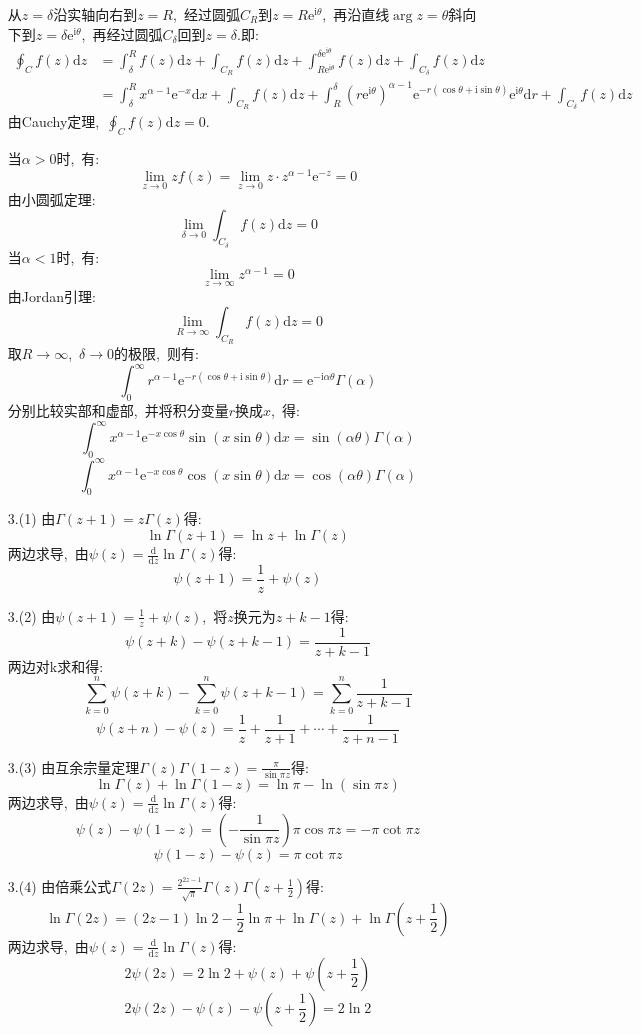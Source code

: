 \documentclass[a4paper,fontset=windows]{ctexart}
\begin{document}
\begin{itemize}
从$z=\delta$沿实轴向右到$z=R$,\ 经过圆弧$C_{R}$到$z=R\mathrm{e}^{\mathrm{i}\theta}$,\ 再沿直线$\arg z=\theta$斜向下到$z=\delta\mathrm{e}^{\mathrm{i}\theta}$,\ 再经过圆弧$C_{\delta}$回到$z=\delta$.即:
\begin{align*}
\oint_{C}f(z)\mathrm{d}z
&=\int_{\delta}^{R}f(z)\mathrm{d}z+
\int_{C_R}f(z)\mathrm{d}z+
\int_{R\mathrm{e}^{\mathrm{i}\theta}}^{\delta\mathrm{e}^{\mathrm{i}\theta}}f(z)\mathrm{d}z+
\int_{C_\delta}f(z)\mathrm{d}z \\
&=\int_{\delta}^{R}x^{\alpha-1}\mathrm{e}^{-x}\mathrm{d}x+
\int_{C_R}f(z)\mathrm{d}z+
\int_{R}^{\delta}\left(r\mathrm{e}^{\mathrm{i}\theta}\right)^{\alpha-1}\mathrm{e}^{-r(\cos\theta+\mathrm{i}\sin\theta)}\mathrm{e}^{\mathrm{i}\theta}\mathrm{d}r+
\int_{C_\delta}f(z)\mathrm{d}z
\end{align*}
由Cauchy定理,\ $\oint_{C}f(z)\mathrm{d}z=0$.

当$\alpha>0$时,\ 有:
\[
\lim_{z\to 0}zf(z)
=\lim_{z\to 0}z\cdot z^{\alpha-1}\mathrm{e}^{-z}
=0
\]
由小圆弧定理:
\[
\lim_{\delta\to 0}\int_{C_\delta}f(z)\mathrm{d}z
=0
\]
当$\alpha<1$时,\ 有:
\[
\lim_{z\to\infty}z^{\alpha-1}
=0
\]
由Jordan引理:
\[
\lim_{R\to\infty}\int_{C_R}f(z)\mathrm{d}z
=0
\]
取$R\rightarrow\infty$,\ $\delta\rightarrow0$的极限,\ 则有:
\[
\int_{0}^{\infty}r^{\alpha-1}\mathrm{e}^{-r(\cos\theta+\mathrm{i}\sin\theta)}\mathrm{d}r
=\mathrm{e}^{-\mathrm{i}\alpha\theta}\Gamma(\alpha)
\]
分别比较实部和虚部,\ 并将积分变量$r$换成$x$,\ 得:
\[
\int_{0}^{\infty}x^{\alpha-1}\mathrm{e}^{-x\cos\theta}\sin(x\sin\theta)\mathrm{d}x
=\sin(\alpha\theta)\Gamma(\alpha)
\]
\[
\int_{0}^{\infty}x^{\alpha-1}\mathrm{e}^{-x\cos\theta}\cos(x\sin\theta)\mathrm{d}x
=\cos(\alpha\theta)\Gamma(\alpha)
\]

\bigskip
\item[3.(1)]
由$\Gamma(z+1)=z\Gamma(z)$得:
\[
\ln\Gamma(z+1)
=\ln z+\ln\Gamma(z)
\]
两边求导,\ 由$\psi(z)=\frac{\mathrm{d}}{\mathrm{d}z}\ln\Gamma(z)$得:
\[
\psi(z+1)
=\frac{1}{z}+\psi(z)
\]

\smallskip
\item[3.(2)]
由$\psi(z+1)=\frac{1}{z}+\psi(z)$,\ 将$z$换元为$z+k-1$得:
\[
\psi(z+k)-\psi(z+k-1)
=\frac{1}{z+k-1}
\]
两边对k求和得:
\[
\sum_{k=0}^{n}\psi(z+k)-\sum_{k=0}^{n}\psi(z+k-1)
=\sum_{k=0}^{n}\frac{1}{z+k-1}
\]
\[
\psi(z+n)-\psi(z)
=\frac{1}{z}+\frac{1}{z+1}+\dotsb+\frac{1}{z+n-1}
\]

\smallskip
\item[3.(3)]
由互余宗量定理$\Gamma(z)\Gamma(1-z)=\frac{\pi}{\sin \pi z}$得: 
\[
\ln\Gamma(z)+\ln\Gamma(1-z)=\ln\pi-\ln(\sin\pi z)
\]
两边求导,\ 由$\psi(z)=\frac{\mathrm{d}}{\mathrm{d}z}\ln\Gamma(z)$得:
\[
\psi(z)-\psi(1-z)
=\left(-\frac{1}{\sin\pi z}\right)\pi\cos\pi z
=-\pi\cot\pi z
\]
\[
\psi(1-z)-\psi(z)
=\pi\cot\pi z
\]

\smallskip
\item[3.(4)]
由倍乘公式$\Gamma(2z)=\frac{2^{2z-1}}{\sqrt\pi}\Gamma(z)\Gamma(z+\frac{1}{2})$得:
\[
\ln\Gamma(2z)
=(2z-1)\ln 2-\frac{1}{2}\ln\pi+\ln\Gamma(z)+\ln\Gamma(z+\frac{1}{2})
\] 
两边求导,\ 由$\psi(z)=\frac{\mathrm{d}}{\mathrm{d}z}\ln\Gamma(z)$得:
\[
2\psi(2z)
=2\ln 2+\psi(z)+\psi(z+\frac{1}{2})
\]
\[
2\psi(2z)-\psi(z)-\psi(z+\frac{1}{2})
=2\ln 2
\]
\end{itemize}
\end{document}
